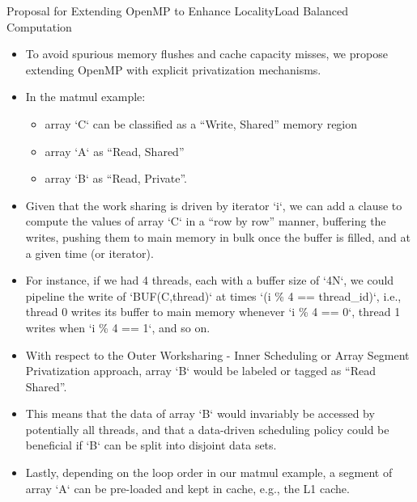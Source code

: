 \begin{frame}{Proposal for Extending OpenMP to Enhance Locality}{Load Balanced Computation}
\begin{itemize} 
\tiny \item \tiny   To avoid spurious memory flushes and cache capacity misses, we propose extending OpenMP with explicit privatization mechanisms.
\item \tiny In the matmul example: 
\begin{itemize} 
\tiny \item \tiny array `C` can be classified as a “Write, Shared” memory region
\item \tiny array `A` as “Read, Shared” 
\item \tiny array `B` as “Read, Private”. 
\end{itemize}
\item \tiny Given that the work sharing is driven by iterator `i`, we can add a clause to compute the values of array `C` in a “row by row” manner, buffering the writes, pushing them to main memory in bulk once the buffer is filled, and at a given time (or iterator).
\item \tiny For instance, if we had 4 threads, each with a buffer size of `4N`, we could pipeline the write of `BUF(C,thread)` at times `(i \% 4 == thread\_id)`, i.e., thread 0 writes its buffer to main memory whenever `i \% 4 == 0`, thread 1 writes when `i \% 4 == 1`, and so on. 
\item \tiny With respect to the Outer Worksharing - Inner Scheduling or Array Segment Privatization approach, array `B` would be labeled or tagged as “Read Shared”. 
\item \tiny  This means that the data of array `B` would invariably be accessed by potentially all threads, and that a data-driven scheduling policy could be beneficial if `B` can be split into disjoint data sets. 
\item \tiny Lastly, depending on the loop order in our matmul example, a segment of array `A` can be pre-loaded and kept in cache, e.g., the L1 cache.
\end{itemize}
\end{frame}

